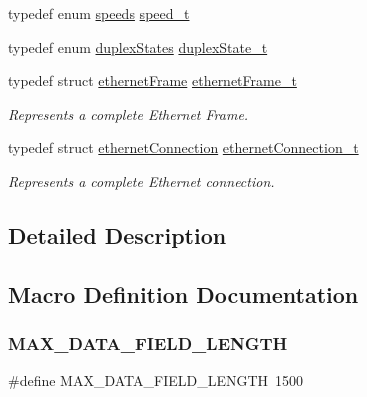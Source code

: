 \begin{DoxyCompactItemize}
\item 
typedef enum \mbox{\hyperlink{group__ethernet_gad51ff69ce00ee5c869723c572db0eefd}{speeds}} \mbox{\hyperlink{group__ethernet_gaf44917bbf64327b78826bc2f74266af8}{speed\+\_\+t}}
\item 
typedef enum \mbox{\hyperlink{group__ethernet_ga07afd358acdd48dc34d82f6ed379316f}{duplex\+States}} \mbox{\hyperlink{group__ethernet_gaf88782ec3aef6eb80f7fb5bcc4fb1401}{duplex\+State\+\_\+t}}
\item 
typedef struct \mbox{\hyperlink{structethernet_frame}{ethernet\+Frame}} \mbox{\hyperlink{group__ethernet_ga7519a7ae14b490659069435698d28a25}{ethernet\+Frame\+\_\+t}}
\begin{DoxyCompactList}\small\item\em Represents a complete Ethernet Frame. \end{DoxyCompactList}\item 
typedef struct \mbox{\hyperlink{structethernet_connection}{ethernet\+Connection}} \mbox{\hyperlink{group__ethernet_gae7b6008a02816680c2e3a1e3d2451a60}{ethernet\+Connection\+\_\+t}}
\begin{DoxyCompactList}\small\item\em Represents a complete Ethernet connection. \end{DoxyCompactList}\end{DoxyCompactItemize}


\subsection{Detailed Description}


\subsection{Macro Definition Documentation}
\mbox{\label{group__ethernet_ga7e41863aa11f513f9f3e6f29535b56e3}} 
\subsubsection{\texorpdfstring{MAX\_DATA\_FIELD\_LENGTH}{MAX\_DATA\_FIELD\_LENGTH}}
{\footnotesize\ttfamily \#define M\+A\+X\+\_\+\+D\+A\+T\+A\+\_\+\+F\+I\+E\+L\+D\+\_\+\+L\+E\+N\+G\+TH~1500}



